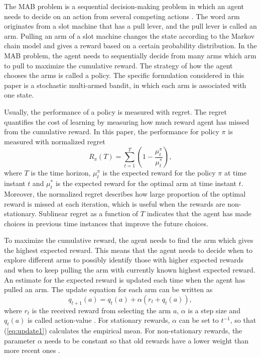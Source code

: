 \documentclass[conference]{IEEEtran}
\begin{document}
The MAB problem is a sequential decision-making problem in which an agent needs to decide on an action from several competing actions \cite{Sutton2018}.
The word arm originates from a slot machine that has a pull lever, and the pull lever is called an arm.
Pulling an arm of a slot machine changes the state according to the Markov chain model and gives a reward based on a certain probability distribution.
In the MAB problem, the agent needs to sequentially decide from many arms which arm to pull to maximize the cumulative reward.
The strategy of how the agent chooses the arms is called a policy.
The specific formulation considered in this paper is a stochastic multi-armed bandit, in which each arm is associated with one state.


Usually, the performance of a policy is measured with regret.
The regret quantifies the cost of learning by measuring how much reward agent has missed from the cumulative reward.
In this paper, the performance for policy $\pi$ is measured with normalized regret
\begin{equation}\label{eq:reg}
    R_\pi(T) = \sum_{t=1}^T \left( 1 - \frac{\mu^\pi_t}{\mu^*_t} \right),
\end{equation}
where $T$ is the time horizon, $\mu^\pi_t$ is the expected reward for the policy $\pi$ at time instant $t$ and $\mu_t^*$ is the expected reward for the optimal arm at time instant $t$.
Moreover, the normalized regret describes how large proportion of the optimal reward is missed at each iteration, which is useful when the rewards are non-stationary.
Sublinear regret as a function of $T$ indicates that the agent has made choices in previous time instances that improve the future choices.

To maximize the cumulative reward, the agent needs to find the arm which gives the highest expected reward.
This means that the agent needs to decide when to explore different arms to possibly identify those with higher expected rewards 
and when to keep pulling the arm with currently known highest expected reward.
An estimate for the expected reward is updated each time when the agent has pulled an arm.
The update equation for each arm can be written as
\begin{equation}\label{eq:update1}
    q_{t+1}(a) = q_{t}(a) + \alpha \left(r_t + q_{t}(a)\right),
\end{equation}
where $r_t$ is the received reward from selecting the arm $a$, $\alpha$ is a step size and $q_{t}(a)$ is called action-value \cite{Sutton2018}.
For stationary rewards, $\alpha$ can be set to $t^{-1}$, so that (\ref{eq:update1}) calculates the empirical mean. 
For non-stationary rewards, the parameter $\alpha$ needs to be constant so that old rewards have a lower weight than more recent ones \cite{Sutton2018}.
\end{document}
